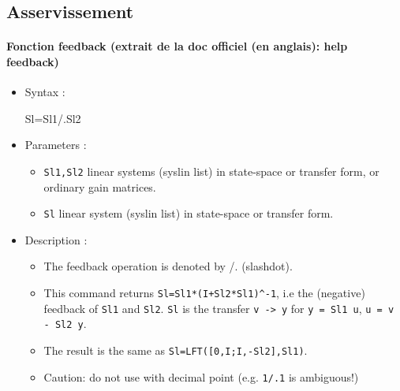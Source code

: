 \subsection{Asservissement}
\begin{doc}
\paragraph{Fonction feedback (extrait de la doc officiel (en anglais): 
           help feedback)}
\begin{itemize}
    \item Syntax :
    \begin{Scilabcode}
Sl=Sl1/.Sl2
    \end{Scilabcode}
    \item Parameters :
    \begin{itemize}
        \item \verb?Sl1,Sl2?  linear systems (syslin list) in state-space or 
              transfer form, or ordinary gain matrices.
        \item \verb?Sl? linear system (syslin list) in state-space or 
              transfer form.
    \end{itemize}

    \item Description :

    \begin{itemize} 
        \item The feedback operation is denoted by /. (slashdot). 
        \item This command returns \verb?Sl=Sl1*(I+Sl2*Sl1)^-1?, i.e 
              the (negative) feedback of \verb?Sl1? and \verb?Sl2?. \verb?Sl? 
              is the transfer \verb?v -> y? for 
              \verb?y = Sl1 u?, \verb?u = v - Sl2 y?.
        \item The result is the same as \verb?Sl=LFT([0,I;I,-Sl2],Sl1)?.
        \item Caution: do not use with decimal point (e.g. \verb?1/.1? 
              is ambiguous!)
    \end{itemize}
\end{itemize}
\end{doc}
